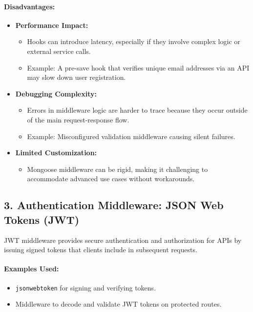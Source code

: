 \paragraph{Disadvantages:}
\begin{itemize}
    \item \textbf{Performance Impact:}
    \begin{itemize}
        \item Hooks can introduce latency, especially if they involve complex logic or external service calls.
        \item Example: A pre-save hook that verifies unique email addresses via an API may slow down user registration.
    \end{itemize}
    \item \textbf{Debugging Complexity:}
    \begin{itemize}
        \item Errors in middleware logic are harder to trace because they occur outside of the main request-response flow.
        \item Example: Misconfigured validation middleware causing silent failures.
    \end{itemize}
    \item \textbf{Limited Customization:}
    \begin{itemize}
        \item Mongoose middleware can be rigid, making it challenging to accommodate advanced use cases without workarounds.
    \end{itemize}
\end{itemize}

\subsection*{3. Authentication Middleware: JSON Web Tokens (JWT)}
JWT middleware provides secure authentication and authorization for APIs by issuing signed tokens that clients include in subsequent requests.

\paragraph{Examples Used:}
\begin{itemize}
    \item \texttt{jsonwebtoken} for signing and verifying tokens.
    \item Middleware to decode and validate JWT tokens on protected routes.
\end{itemize}

